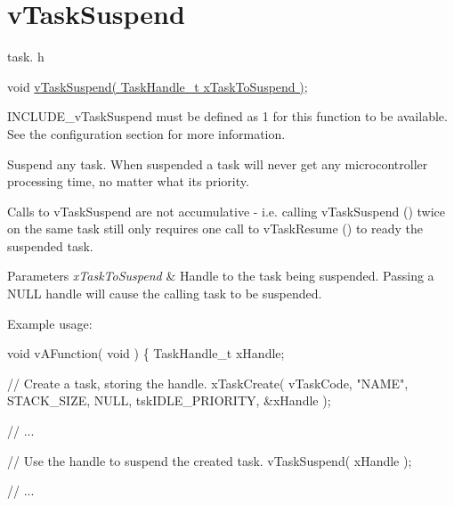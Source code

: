 \hypertarget{group__v_task_suspend}{}\section{v\+Task\+Suspend}
\label{group__v_task_suspend}
task. h 
\begin{DoxyPre}
void \hyperlink{externals_2freertos_2include_2task_8h_a84d4e660b04630be2939d91b3c2412f8}{vTaskSuspend( TaskHandle\_t xTaskToSuspend )};
\end{DoxyPre}


I\+N\+C\+L\+U\+D\+E\+\_\+v\+Task\+Suspend must be defined as 1 for this function to be available. See the configuration section for more information.

Suspend any task. When suspended a task will never get any microcontroller processing time, no matter what its priority.

Calls to v\+Task\+Suspend are not accumulative -\/ i.\+e. calling v\+Task\+Suspend () twice on the same task still only requires one call to v\+Task\+Resume () to ready the suspended task.


\begin{DoxyParams}{Parameters}
{\em x\+Task\+To\+Suspend} & Handle to the task being suspended. Passing a N\+U\+LL handle will cause the calling task to be suspended.\\
\hline
\end{DoxyParams}
Example usage\+: 
\begin{DoxyPre}
void vAFunction( void )
\{
TaskHandle\_t xHandle;\end{DoxyPre}



\begin{DoxyPre}  // Create a task, storing the handle.
  xTaskCreate( vTaskCode, "NAME", STACK\_SIZE, NULL, tskIDLE\_PRIORITY, \&xHandle );\end{DoxyPre}



\begin{DoxyPre}  // ...\end{DoxyPre}



\begin{DoxyPre}  // Use the handle to suspend the created task.
  vTaskSuspend( xHandle );\end{DoxyPre}



\begin{DoxyPre}  // ...\end{DoxyPre}



